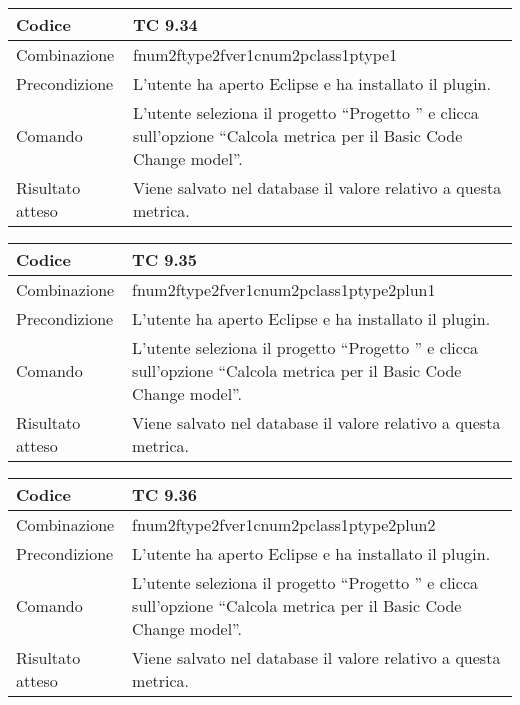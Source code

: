 \clearpage

\begin{table}[ht]
\begin{tabular}{|p{3cm}|p{9cm}|}
\hline
\cellcolor{lightgray}Codice				& TC 9.34								\\
\hline
\cellcolor{lightgray}Combinazione		& fnum2ftype2fver1cnum2pclass1ptype1									\\
\hline
\cellcolor{lightgray}Precondizione		& L'utente ha aperto Eclipse e ha installato il plugin.		\\
\hline
\cellcolor{lightgray}Comando			& L'utente seleziona il progetto ``Progetto ''  e clicca sull'opzione ``Calcola metrica per il Basic Code Change model''.	\\
\hline
\cellcolor{lightgray}Risultato atteso	& Viene salvato nel database il valore relativo a questa metrica.\\
\hline
\end{tabular}
\end{table}

\begin{table}[ht]
\begin{tabular}{|p{3cm}|p{9cm}|}
\hline
\cellcolor{lightgray}Codice				& TC 9.35								\\
\hline
\cellcolor{lightgray}Combinazione		& fnum2ftype2fver1cnum2pclass1ptype2plun1									\\
\hline
\cellcolor{lightgray}Precondizione		& L'utente ha aperto Eclipse e ha installato il plugin.		\\
\hline
\cellcolor{lightgray}Comando			& L'utente seleziona il progetto ``Progetto ''  e clicca sull'opzione ``Calcola metrica per il Basic Code Change model''.	\\
\hline
\cellcolor{lightgray}Risultato atteso	& Viene salvato nel database il valore relativo a questa metrica.\\
\hline
\end{tabular}
\end{table}

\begin{table}[ht]
\begin{tabular}{|p{3cm}|p{9cm}|}
\hline
\cellcolor{lightgray}Codice				& TC 9.36								\\
\hline
\cellcolor{lightgray}Combinazione		& fnum2ftype2fver1cnum2pclass1ptype2plun2									\\
\hline
\cellcolor{lightgray}Precondizione		& L'utente ha aperto Eclipse e ha installato il plugin.		\\
\hline
\cellcolor{lightgray}Comando			& L'utente seleziona il progetto ``Progetto ''  e clicca sull'opzione ``Calcola metrica per il Basic Code Change model''.	\\
\hline
\cellcolor{lightgray}Risultato atteso	& Viene salvato nel database il valore relativo a questa metrica.\\
\hline
\end{tabular}
\end{table}

